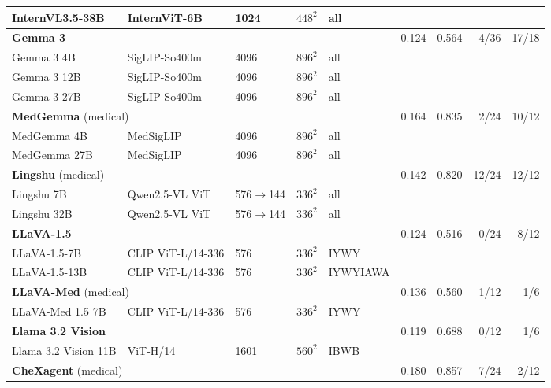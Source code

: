 \begin{table}[tp]
{\begin{tabular}{lllll@{\hspace{8pt}}rrrr}
\quad InternVL3.5-38B & InternViT-6B & 1024 & $448^2$ & all & & & & \\
\midrule
\multicolumn{5}{l}{\textbf{Gemma 3}~\citep{gemma2025gemma3}} & 0.124 & 0.564 & \cellcolor{cfTerra2}4/36 & \cellcolor{cfTerra4}17/18 \\
\quad Gemma 3 4B & SigLIP-So400m & 4096 & $896^2$ & all & & & & \\
\quad Gemma 3 12B & SigLIP-So400m & 4096 & $896^2$ & all & & & & \\
\quad Gemma 3 27B & SigLIP-So400m & 4096 & $896^2$ & all & & & & \\
\midrule
\multicolumn{5}{l}{\textbf{MedGemma} (medical)~\citep{sellergren2025medgemma}} & 0.164 & 0.835 & \cellcolor{cfTerra2}2/24 & \cellcolor{cfTerra3}10/12 \\
\quad MedGemma 4B & MedSigLIP & 4096 & $896^2$ & all & & & & \\
\quad MedGemma 27B & MedSigLIP & 4096 & $896^2$ & all & & & & \\
\midrule
\multicolumn{5}{l}{\textbf{Lingshu} (medical)~\citep{lasa2025lingshu}} & 0.142 & 0.820 & \cellcolor{cfTerra4}12/24 & \cellcolor{cfTerra4}12/12 \\
\quad Lingshu 7B & Qwen2.5-VL ViT & 576$\to$144 & $336^2$ & all & & & & \\
\quad Lingshu 32B & Qwen2.5-VL ViT & 576$\to$144 & $336^2$ & all & & & & \\
\midrule
\multicolumn{5}{l}{\textbf{LLaVA-1.5}~\citep{liu2024improved}} & 0.124 & 0.516 & \cellcolor{cfTerra1}0/24 & \cellcolor{cfTerra3}8/12 \\
\quad LLaVA-1.5-7B & CLIP ViT-L/14-336 & 576 & $336^2$ & IYWY & & & & \\
\quad LLaVA-1.5-13B & CLIP ViT-L/14-336 & 576 & $336^2$ & IYWYIAWA & & & & \\
\midrule
\multicolumn{5}{l}{\textbf{LLaVA-Med} (medical)~\citep{li2023llavamed}} & 0.136 & 0.560 & \cellcolor{cfTerra2}1/12 & \cellcolor{cfTerra2}1/6 \\
\quad LLaVA-Med 1.5 7B & CLIP ViT-L/14-336 & 576 & $336^2$ & IYWY & & & & \\
\midrule
\multicolumn{5}{l}{\textbf{Llama 3.2 Vision}~\citep{meta2024llama32vision}} & 0.119 & 0.688 & \cellcolor{cfTerra1}0/12 & \cellcolor{cfTerra2}1/6 \\
\quad Llama 3.2 Vision 11B & ViT-H/14 & 1601 & $560^2$ & IBWB & & & & \\
\midrule
\multicolumn{5}{l}{\textbf{CheXagent} (medical)~\citep{chen2024chexagent}} & 0.180 & 0.857 & \cellcolor{cfTerra3}7/24 & \cellcolor{cfTerra2}2/12 \\

\end{tabular}}
\end{table}
